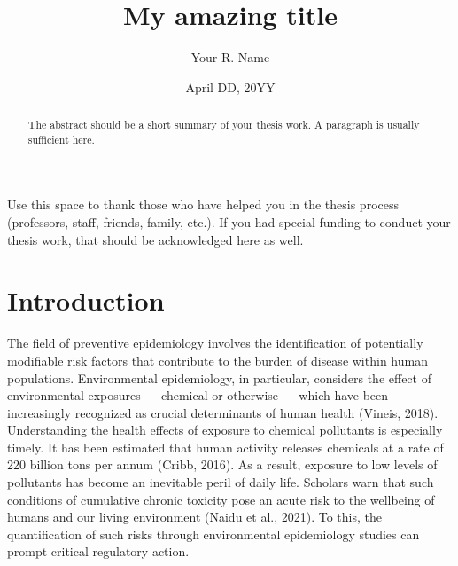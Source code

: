 \documentclass[12pt, twoside]{amherstthesis}
\title{My amazing title}
\author{Your R. Name}
\date{April DD, 20YY}
\begin{document}
\doublespace
  \maketitle

\frontmatter %
\pagestyle{fancyplain}

  \begin{abstract}
    The abstract should be a short summary of your thesis work. A paragraph is usually sufficient here.
  \end{abstract}
  \begin{acknowledgments}
    Use this space to thank those who have helped you in the thesis process (professors, staff, friends, family, etc.). If you had special funding to conduct your thesis work, that should be acknowledged here as well.
  \end{acknowledgments}

  \hypersetup{linkcolor=black}
  \setcounter{tocdepth}{2}
  \tableofcontents

  \listoftables

  \listoffigures


\mainmatter %
\pagestyle{fancyplain} %

\hypertarget{intro}{%
\chapter{Introduction}\label{intro}}

The field of preventive epidemiology involves the identification of potentially modifiable risk factors that contribute to the burden of disease within human populations. Environmental epidemiology, in particular, considers the effect of environmental exposures --- chemical or otherwise --- which have been increasingly recognized as crucial determinants of human health (Vineis, 2018). Understanding the health effects of exposure to chemical pollutants is especially timely. It has been estimated that human activity releases chemicals at a rate of 220 billion tons per annum (Cribb, 2016). As a result, exposure to low levels of pollutants has become an inevitable peril of daily life. Scholars warn that such conditions of cumulative chronic toxicity pose an acute risk to the wellbeing of humans and our living environment (Naidu et al., 2021). To this, the quantification of such risks through environmental epidemiology studies can prompt critical regulatory action.
\end{document}
